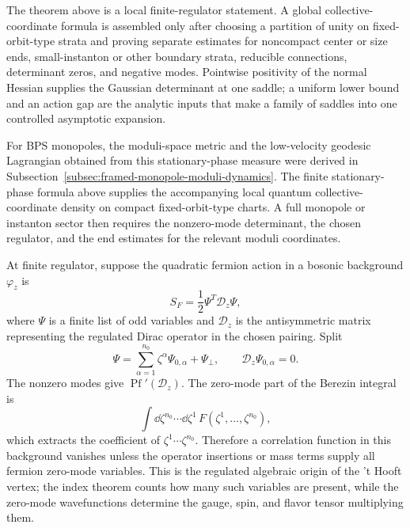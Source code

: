 \begin{controlledapproximation}
\label{ca:collective-coordinate-local-to-global}
The theorem above is a local finite-regulator statement.  A global
collective-coordinate formula is assembled only after choosing a partition of
unity on fixed-orbit-type strata and proving separate estimates for noncompact
center or size ends, small-instanton or other boundary strata, reducible
connections, determinant zeros, and negative modes.  Pointwise positivity of
the normal Hessian supplies the Gaussian determinant at one saddle; a uniform
lower bound and an action gap are the analytic inputs that make a family of
saddles into one controlled asymptotic expansion.
\end{controlledapproximation}

For BPS monopoles, the moduli-space metric and the low-velocity geodesic
Lagrangian obtained from this stationary-phase measure were derived in
Subsection~\ref{subsec:framed-monopole-moduli-dynamics}.  The finite
stationary-phase formula above supplies the accompanying local quantum
collective-coordinate density on compact fixed-orbit-type charts.  A full
monopole or instanton sector then requires the nonzero-mode determinant, the
chosen regulator, and the end estimates for the relevant moduli coordinates.

\begin{construction}
\label{con:fermion-zero-mode-berezin-saturation}
At finite regulator, suppose the quadratic fermion action in a bosonic
background \(\varphi_z\) is
\[
  S_F=\frac12\Psi^T\mathcal D_z\Psi,
\]
where \(\Psi\) is a finite list of odd variables and
\(\mathcal D_z\) is the antisymmetric matrix representing the regulated
Dirac operator in the chosen pairing.  Split
\[
  \Psi=\sum_{\alpha=1}^{n_0}\zeta^\alpha\Psi_{0,\alpha}
       +\Psi_\perp,
  \qquad
  \mathcal D_z\Psi_{0,\alpha}=0 .
\]
The nonzero modes give \(\operatorname{Pf}'(\mathcal D_z)\).  The zero-mode
part of the Berezin integral is
\[
  \int \dd\zeta^{n_0}\cdots\dd\zeta^1\,
  F(\zeta^1,\ldots,\zeta^{n_0}),
\]
which extracts the coefficient of
\(\zeta^1\cdots\zeta^{n_0}\).  Therefore a correlation function in this
background vanishes unless the operator insertions or mass terms supply all
fermion zero-mode variables.  This is the regulated algebraic origin of the
't Hooft vertex; the index theorem counts how many such variables are
present, while the zero-mode wavefunctions determine the gauge, spin, and
flavor tensor multiplying them.
\end{construction}

